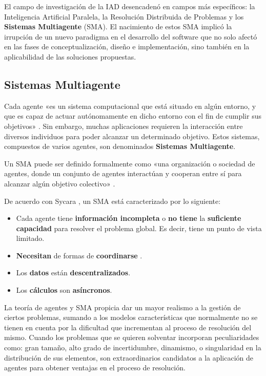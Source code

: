 El campo de investigación de la \acs{IAD} desencadenó en campos más específicos: la Inteligencia Artificial Paralela, la Resolución Distribuida de Problemas y los \textbf{Sistemas Multiagente} (\acs{SMA}). El nacimiento de estos \acs{SMA} implicó la irrupción de un nuevo paradigma en el desarrollo del software que no solo afectó en las fases de conceptualización, diseño e implementación, sino también en la aplicabilidad de las soluciones propuestas.  

\subsection{Sistemas Multiagente}
\label{sec:sismultiagente}

Cada agente «es un sistema computacional que está situado en algún entorno, y que es capaz de actuar autónomamente en dicho entorno con el fin de cumplir sus objetivos» \cite{agente}. Sin embargo, muchas aplicaciones requieren la interacción entre diversos individuos para poder alcanzar un determinado objetivo. Estos sistemas, compuestos de varios agentes, son denominados \textbf{Sistemas Multiagente}.

Un \acs{SMA} puede ser definido formalmente como «una organización o sociedad de agentes, donde un conjunto de agentes interactúan y cooperan entre sí para alcanzar algún objetivo colectivo» \cite{sma}.

De acuerdo con Sycara \cite{sma2}, un \acs{SMA} está caracterizado por lo siguiente:
\begin{itemize}
\item Cada agente tiene \textbf{información incompleta} o \textbf{no tiene} la \textbf{suficiente capacidad} para resolver el problema global. Es decir, tiene un punto de vista limitado.
\item \textbf{Necesitan} de formas de \textbf{coordinarse} .
\item Los \textbf{datos} están \textbf{descentralizados}.
\item Los \textbf{cálculos} son \textbf{asíncronos}.
\end{itemize}
 
La teoría de agentes y \acs{SMA} propicia dar un mayor realismo a la gestión de ciertos problemas, sumando a los modelos características que normalmente no se tienen en cuenta por la dificultad que incrementan al proceso de resolución del mismo. Cuando los problemas que se quieren solventar incorporan peculiaridades como: gran tamaño, alto grado de incertidumbre, dinamismo, o singularidad en la distribución de sus elementos, son extraordinarios candidatos a la aplicación de agentes para obtener ventajas en el proceso de resolución. 

